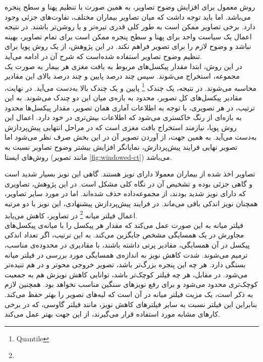 روش معمول برای افزایش وضوح تصاویر، به همین صورت با تنظیم پهنا و سطح پنجره می‌باشد.
اما باید توجه داشت که میان تصاویر بیماران مختلف، تفاوت‌های جزئی وجود دارد.
برخی تصاویر ممکن است به طور کلی قدری تیره‌تر و یا روشن‌تر باشند.
در نتیجه اعمال یک سیاست واحد برای پهنا و سطح پنجره ممکن است برای تمام تصاویر، بهینه نباشد و وضوح لازم را برای تصویر فراهم نکند.
در این پژوهش، از یک روش پویا برای تنظیم وضوح تصاویر استفاده شده‌است که شرح آن در ادامه می‌آید.\\

در این روش، ابتدا مقدار پیکسل‌های مربوط به بافت مغزی هر بیمار به صورت یک مجموعه، استخراج می‌شوند.
سپس چند درصد پایین و چند درصد بالای این مقادیر محاسبه می‌شوند.
در نتیجه، یک چندک
\footnote{Quantile} 
پایین و یک چندک بالا به‌دست می‌آید.
در نهایت، مقادیر پیکسل‌های کل تصویر، محدود به بازه‌ی میان این دو چندک می‌شوند.
به این ترتیب، در هر تصویری، با توجه به اطلاعات آماری همان تصویر، 
مقدار پیکسل‌ها محدود به بازه‌ای از رنگ خاکستری می‌شود که اطلاعات بیش‌تری در خود دارد.
اعمال این روش پویا، نیازمند استخراج بافت مغزی است که در مراحل انتهایی پیش‌پردازش به‌دست می‌آید.
به همین جهت، از آوردن تصویر آن در این بخش صرف نظر می‌شود
اما تصویر نهایی فرایند پیش‌پردازش، نمایانگر افزایش بیشتر وضوح 
تصاویر نسبت به روش‌های ایستا (مانند تصویر \ref{fig:windowed-ct}) می‌باشد.\\


تصاویر اخذ شده از بیماران معمولا دارای نویز هستند.
گاهی این نویز بسیار شدید است و گاهی جزئی بوده و تشخیص آن در نگاه کلی مشکل است.
در این پژوهش، تصاویری که دارای نویز شدید بودند، از مجموعه‌داده حذف شده‌اند.
اما در مورد سایر تصاویر، همچنان نویز اندکی باقی می‌ماند.
در فرایند پیش‌پردازش پیشنهادی، این نویز با دو مرتبه اعمال فیلتر میانه
\footnote{}
در تصاویر، کاهش می‌یابد.\\

فیلتر میانه به این صورت عمل می‌کند که مقدار هر پیکسل را 
با میانه‌ی پیکسل‌های مجاورش در یک همسایگی مشخص جایگزین می‌کند.
به این ترتیب، اگر تعداد اندکی پیکسل در آن همسایگی، مقادیر پرتی داشته باشند، با مقادیری در محدوده‌ی مناسب، ترمیم می‌شوند.
شدت کاهش نویز به اندازه‌ی همسایگی مورد بررسی در فیلتر میانه بستگی دارد.
هر چه این پنجره بزرگ‌تر باشد، تصویر خروجی محو‌تر و در هم تنیده‌تر
می‌شود.
در مقابل، هر چه فیلتر کوچک‌تر باشد، توانایی کاهش نویزش هم به جمعیت کوچک‌تری محدود می‌شود و برای رفع نویز‌های سنگین مناسب نخواهد بود.
همچنین لازم به ذکر است، یک مزیت فیلتر میانه در آن است که لبه‌های تصویر را بهتر حفظ می‌کند.
بنابراین این فیلتر نسبت به سایر فیلتر‌های کاهش نویز، مانند فیلتر گاوسی، که در برخی کارهای مشابه مورد استفاده قرار می‌گیرند، از این جهت بهتر عمل می‌کند.\\

